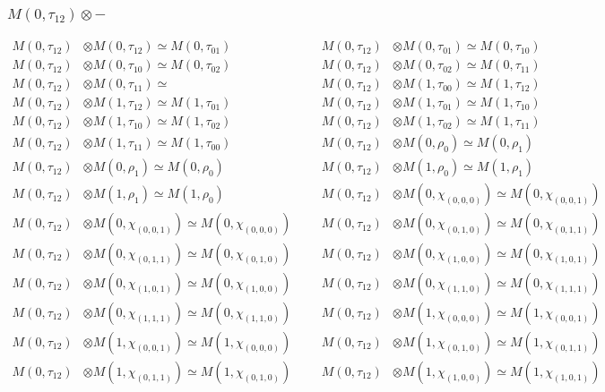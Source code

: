 \subsubsection{$ M(0,\tau_{12})\otimes -$}
\begin{align*}
M(0,\tau_{12}) &\otimes M(0,\tau_{12}) \simeq M(0,\tau_{01}) &&& M(0,\tau_{12}) &\otimes M(0,\tau_{01}) \simeq M(0,\tau_{10})\\
M(0,\tau_{12}) &\otimes M(0,\tau_{10}) \simeq M(0,\tau_{02}) &&& M(0,\tau_{12}) &\otimes M(0,\tau_{02}) \simeq M(0,\tau_{11})\\
M(0,\tau_{12}) &\otimes M(0,\tau_{11}) \simeq  &&& M(0,\tau_{12}) &\otimes M(1,\tau_{00}) \simeq M(1,\tau_{12})\\
M(0,\tau_{12}) &\otimes M(1,\tau_{12}) \simeq M(1,\tau_{01}) &&& M(0,\tau_{12}) &\otimes M(1,\tau_{01}) \simeq M(1,\tau_{10})\\
M(0,\tau_{12}) &\otimes M(1,\tau_{10}) \simeq M(1,\tau_{02}) &&& M(0,\tau_{12}) &\otimes M(1,\tau_{02}) \simeq M(1,\tau_{11})\\
M(0,\tau_{12}) &\otimes M(1,\tau_{11}) \simeq M(1,\tau_{00}) &&& M(0,\tau_{12}) &\otimes M(0,\rho_{0}) \simeq M(0,\rho_{1})\\
M(0,\tau_{12}) &\otimes M(0,\rho_{1}) \simeq M(0,\rho_{0}) &&& M(0,\tau_{12}) &\otimes M(1,\rho_{0}) \simeq M(1,\rho_{1})\\
M(0,\tau_{12}) &\otimes M(1,\rho_{1}) \simeq M(1,\rho_{0}) &&& M(0,\tau_{12}) &\otimes M(0,\chi_{(0,0,0)}) \simeq M(0,\chi_{(0,0,1)})\\
M(0,\tau_{12}) &\otimes M(0,\chi_{(0,0,1)}) \simeq M(0,\chi_{(0,0,0)}) &&& M(0,\tau_{12}) &\otimes M(0,\chi_{(0,1,0)}) \simeq M(0,\chi_{(0,1,1)})\\
M(0,\tau_{12}) &\otimes M(0,\chi_{(0,1,1)}) \simeq M(0,\chi_{(0,1,0)}) &&& M(0,\tau_{12}) &\otimes M(0,\chi_{(1,0,0)}) \simeq M(0,\chi_{(1,0,1)})\\
M(0,\tau_{12}) &\otimes M(0,\chi_{(1,0,1)}) \simeq M(0,\chi_{(1,0,0)}) &&& M(0,\tau_{12}) &\otimes M(0,\chi_{(1,1,0)}) \simeq M(0,\chi_{(1,1,1)})\\
M(0,\tau_{12}) &\otimes M(0,\chi_{(1,1,1)}) \simeq M(0,\chi_{(1,1,0)}) &&& M(0,\tau_{12}) &\otimes M(1,\chi_{(0,0,0)}) \simeq M(1,\chi_{(0,0,1)})\\
M(0,\tau_{12}) &\otimes M(1,\chi_{(0,0,1)}) \simeq M(1,\chi_{(0,0,0)}) &&& M(0,\tau_{12}) &\otimes M(1,\chi_{(0,1,0)}) \simeq M(1,\chi_{(0,1,1)})\\
M(0,\tau_{12}) &\otimes M(1,\chi_{(0,1,1)}) \simeq M(1,\chi_{(0,1,0)}) &&& M(0,\tau_{12}) &\otimes M(1,\chi_{(1,0,0)}) \simeq M(1,\chi_{(1,0,1)})\\

\end{align*}
